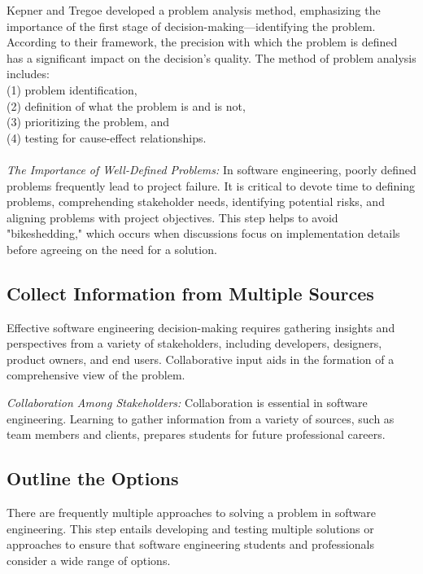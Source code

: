 \documentclass[a4paper,12pt]{report}
\begin{document}
Kepner and Tregoe developed a problem analysis method, emphasizing the importance of the first stage of decision-making—identifying the problem. According to their framework, the precision with which the problem is defined has a significant impact on the decision's quality\cite{lunenburg2010decision}. The method of problem analysis includes: 
\\(1) problem identification,\\(2) definition of what the problem is and is not,\\ (3) prioritizing the problem, and \\(4) testing for cause-effect relationships.
\\
\\\textit{The Importance of Well-Defined Problems:} In software engineering, poorly defined problems frequently lead to project failure. It is critical to devote time to defining problems, comprehending stakeholder needs, identifying potential risks, and aligning problems with project objectives. This step helps to avoid "bikeshedding," which occurs when discussions focus on implementation details before agreeing on the need for a solution.



\subsection{Collect Information from Multiple Sources}
Effective software engineering decision-making requires gathering insights and perspectives from a variety of stakeholders, including developers, designers, product owners, and end users. Collaborative input aids in the formation of a comprehensive view of the problem.

\textit{Collaboration Among Stakeholders:} Collaboration is essential in software engineering. Learning to gather information from a variety of sources, such as team members and clients, prepares students for future professional careers.

\subsection{Outline the Options}
There are frequently multiple approaches to solving a problem in software engineering. This step entails developing and testing multiple solutions or approaches to ensure that software engineering students and professionals consider a wide range of options.
\end{document}
